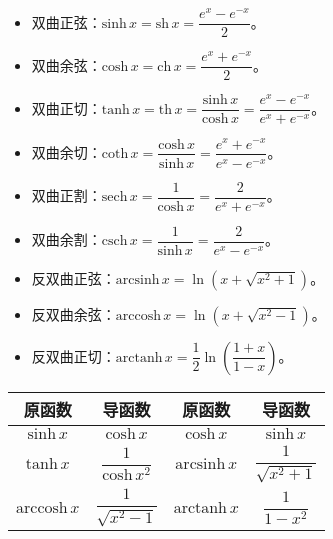 \documentclass[UTF8, 12pt]{ctexart}
\begin{document}
\begin{itemize}
    \item 双曲正弦：$\textrm{sinh}\,x=\textrm{sh}\,x=\dfrac{e^{x}-e^{-x}}{2}$。
    \item 双曲余弦：$\textrm{cosh}\,x=\textrm{ch}\,x=\dfrac{e^{x}+e^{-x}}{2}$。
    \item 双曲正切：$\textrm{tanh}\,x=\textrm{th}\,x=\dfrac{\textrm{sinh}\,x}{\textrm{cosh}\,x}=\dfrac{e^{x}-e^{-x}}{e^{x}+e^{-x}}$。
    \item 双曲余切：$\textrm{coth}\,x=\dfrac{\textrm{cosh}\,x}{\textrm{sinh}\,x}=\dfrac{e^{x}+e^{-x}}{e^{x}-e^{-x}}$。
    \item 双曲正割：$\textrm{sech}\,x=\dfrac{1}{\textrm{cosh}\,x}=\dfrac{2}{e^{x}+e^{-x}}$。
    \item 双曲余割：$\textrm{csch}\,x=\dfrac{1}{\textrm{sinh}\,x}=\dfrac{2}{e^{x}-e^{-x}}$。
    \item 反双曲正弦：$\textrm{arcsinh}\,x=\ln\left(x+\sqrt{x^2+1}\right)$。
    \item 反双曲余弦：$\textrm{arccosh}\,x=\ln\left(x+\sqrt{x^2-1}\right)$。
    \item 反双曲正切：$\textrm{arctanh}\,x=\dfrac{1}{2}\ln\left(\dfrac{1+x}{1-x}\right)$。
\end{itemize}

\begin{center}
    \begin{tabular}{|c|c|c|c|}
        \hline
        原函数 & 导函数 & 原函数 & 导函数\\ \hline
        $\textrm{sinh}\,x$ & $\textrm{cosh}\,x$ & $\textrm{cosh}\,x$ & $\textrm{sinh}\,x$ \\ \hline
        $\textrm{tanh}\,x$ & $\dfrac{1}{\textrm{cosh}\,x^2}$ & $\textrm{arcsinh}\,x$ & $\dfrac{1}{\sqrt{x^2+1}}$ \\ \hline
        $\textrm{arccosh}\,x$ & $\dfrac{1}{\sqrt{x^2-1}}$ & $\textrm{arctanh}\,x$ & $\dfrac{1}{1-x^2}$ \\
        \hline
    \end{tabular}
\end{center}
\end{document}
